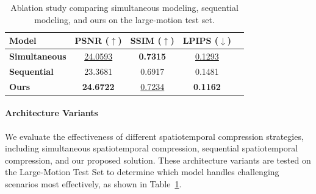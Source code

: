 \begin{table}[ht]
    \centering
    \setlength\tabcolsep{2pt} %
    \renewcommand{\arraystretch}{1.2} %
    \begin{tabular}{lcccc}
        \toprule
        \textbf{Model} & \textbf{PSNR ($\uparrow$)} & \textbf{SSIM ($\uparrow$)} & \textbf{LPIPS ($\downarrow$)} \\
        \midrule 
        \textbf{Simultaneous } & \underline{24.0593} & \textbf{0.7315} & \underline{0.1293} \\
        \textbf{Sequential} & 23.3681 & 0.6917 & 0.1481 \\
        \textbf{Ours} & \textbf{24.6722} & \underline{0.7234} & \textbf{0.1162} \\
        \bottomrule
    \end{tabular}
    \caption{Ablation study comparing simultaneous modeling, sequential modeling, and ours on the large-motion test set.}
    \label{tab:ablation_architecture}
    \vspace{-5mm}
\end{table}


\paragraph{Architecture Variants}
We evaluate the effectiveness of different spatiotemporal compression strategies, including simultaneous spatiotemporal compression, sequential spatiotemporal compression, and our proposed solution. These architecture variants are tested on the Large-Motion Test Set to determine which model handles challenging scenarios most effectively, as shown in Table~\ref{tab:ablation_architecture}. 

